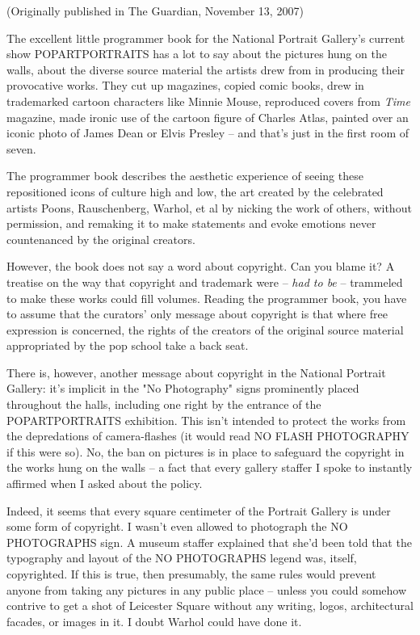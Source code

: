 (Originally published in The Guardian, November 13, 2007)

The excellent little programmer book for the National Portrait
Gallery's current show POPARTPORTRAITS has a lot to say about the
pictures hung on the walls, about the diverse source material the
artists drew from in producing their provocative works. They cut up
magazines, copied comic books, drew in trademarked cartoon
characters like Minnie Mouse, reproduced covers from \emph{Time}
magazine, made ironic use of the cartoon figure of Charles Atlas,
painted over an iconic photo of James Dean or Elvis Presley -- and
that's just in the first room of seven.

The programmer book describes the aesthetic experience of seeing
these repositioned icons of culture high and low, the art created
by the celebrated artists Poons, Rauschenberg, Warhol, et al by
nicking the work of others, without permission, and remaking it to
make statements and evoke emotions never countenanced by the
original creators.

However, the book does not say a word about copyright. Can you
blame it? A treatise on the way that copyright and trademark were
-- \emph{had to be} -- trammeled to make these works could fill
volumes. Reading the programmer book, you have to assume that the
curators' only message about copyright is that where free
expression is concerned, the rights of the creators of the original
source material appropriated by the pop school take a back seat.

There is, however, another message about copyright in the National
Portrait Gallery: it's implicit in the "No Photography" signs
prominently placed throughout the halls, including one right by the
entrance of the POPARTPORTRAITS exhibition. This isn't intended to
protect the works from the depredations of camera-flashes (it would
read NO FLASH PHOTOGRAPHY if this were so). No, the ban on pictures
is in place to safeguard the copyright in the works hung on the
walls -- a fact that every gallery staffer I spoke to instantly
affirmed when I asked about the policy.

Indeed, it seems that every square centimeter of the Portrait
Gallery is under some form of copyright. I wasn't even allowed to
photograph the NO PHOTOGRAPHS sign. A museum staffer explained that
she'd been told that the typography and layout of the NO
PHOTOGRAPHS legend was, itself, copyrighted. If this is true, then
presumably, the same rules would prevent anyone from taking any
pictures in any public place -- unless you could somehow contrive
to get a shot of Leicester Square without any writing, logos,
architectural facades, or images in it. I doubt Warhol could have
done it.

